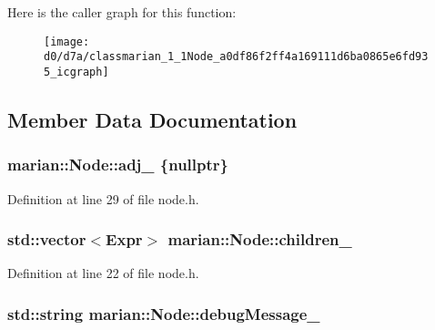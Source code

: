 Here is the caller graph for this function\+:
\nopagebreak
\begin{figure}[H]
\begin{center}
\leavevmode
\texttt{[image: d0/d7a/classmarian\_1\_1Node\_a0df86f2ff4a169111d6ba0865e6fd935\_icgraph]}
\end{center}
\end{figure}




\subsection{Member Data Documentation}
\subsubsection[{\texorpdfstring{adj\+\_\+}{adj_}}]{ marian\+::\+Node\+::adj\+\_\+ \{nullptr\}\hspace{0.3cm}{\ttfamily [protected]}}\hypertarget{classmarian_1_1Node_a13a0badd98010fdd2536cb5d055ade5a}{}\label{classmarian_1_1Node_a13a0badd98010fdd2536cb5d055ade5a}


Definition at line 29 of file node.\+h.

\subsubsection[{\texorpdfstring{children\+\_\+}{children_}}]{\setlength{\rightskip}{0pt plus 5cm}std\+::vector$<${\bf Expr}$>$ marian\+::\+Node\+::children\+\_\+\hspace{0.3cm}{\ttfamily [protected]}}\hypertarget{classmarian_1_1Node_a4d44ab201d96c0f283188bcc91f64b1d}{}\label{classmarian_1_1Node_a4d44ab201d96c0f283188bcc91f64b1d}


Definition at line 22 of file node.\+h.

\subsubsection[{\texorpdfstring{debug\+Message\+\_\+}{debugMessage_}}]{\setlength{\rightskip}{0pt plus 5cm}std\+::string marian\+::\+Node\+::debug\+Message\+\_\+\hspace{0.3cm}{\ttfamily [protected]}}\hypertarget{classmarian_1_1Node_a98e7e9a443d642dc1aeadb2f015a12e0}{}\label{classmarian_1_1Node_a98e7e9a443d642dc1aeadb2f015a12e0}



